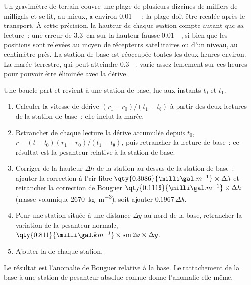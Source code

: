 Un gravimètre de terrain couvre une plage de plusieurs dizaines de milliers de
milligals et se lit, au mieux, à environ \qty{0.01}{\milli\gal}~; la plage doit être
recalée après le transport. À cette précision, la hauteur de chaque station
compte autant que sa lecture~: une erreur de \qty{3.3}{cm} sur la hauteur fausse
\qty{0.01}{\milli\gal}, si bien que les positions sont relevées au moyen de récepteurs
satellitaires ou d'un niveau, au centimètre près. La station de base est réoccupée
toutes les deux heures environ. La marée terrestre, qui peut atteindre
\qty{0.3}{\milli\gal}, varie assez lentement sur ces heures pour pouvoir être éliminée
avec la dérive.

\begin{method}\label{met:b3:field-lab-methods-3:loop}
Une boucle part et revient à une station de base, lue aux instants $t_0$ et $t_1$.
\begin{enumerate}
  \item Calculer la vitesse de dérive $(r_1 - r_0)/(t_1 - t_0)$ à partir des deux
        lectures de la station de base~; elle inclut la marée.
  \item Retrancher de chaque lecture la dérive accumulée depuis $t_0$,
        $r - (t - t_0)(r_1 - r_0)/(t_1 - t_0)$, puis retrancher la lecture de base~:
        ce résultat est la pesanteur relative à la station de base.
  \item Corriger de la hauteur $\Delta h$ de la station au-dessus de la station de base~:
        ajouter la correction à l'air libre $\qty{0.3086}{\milli\gal.m^{-1}}
        \times\Delta h$ et retrancher la correction de Bouguer
        $\qty{0.1119}{\milli\gal.m^{-1}}\times\Delta h$ (masse volumique
        \qty{2670}{kg.m^{-3}}), soit ajouter $0.1967\,\Delta h$.
  \item Pour une station située à une distance $\Delta y$ au nord de la base, retrancher
        la variation de la pesanteur normale, $\qty{0.811}{\milli\gal.km^{-1}}
        \times\sin 2\varphi\times\Delta y$.
  \item Ajouter la  de chaque station.
\end{enumerate}
Le résultat est l'anomalie de Bouguer relative à la base. Le rattachement de la base
à une station de pesanteur absolue connue donne l'anomalie elle-même.
\end{method}

